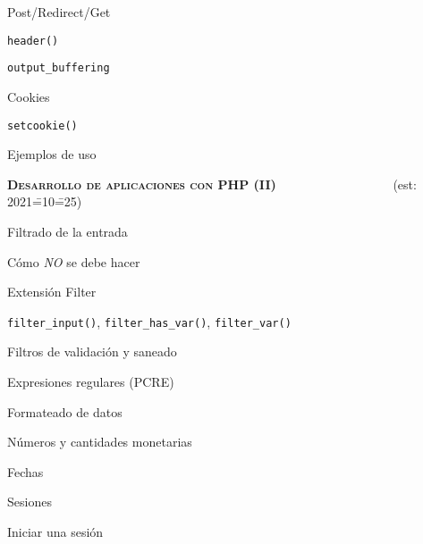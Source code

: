 \begin{longenum}
\begin{longenum}
\begin{longenum}
        \end{longenum}
        \item Post/Redirect/Get
        \item \texttt{header()}
        \begin{longenum}
            \item \texttt{output\_buffering}
        \end{longenum}
        \item Cookies
        \begin{longenum}
            \item \texttt{setcookie()}
            \item Ejemplos de uso
        \end{longenum}
    \end{longenum}
    \item \textbf{\textsc{Desarrollo de aplicaciones con PHP (II)}} \ \ \ \ \ \ \ \ \ \ \ \ \ \ \ \ \ \ (est: 2021\==10\==25)
    \begin{longenum}
        \item Filtrado de la entrada
        \begin{longenum}
            \item Cómo \textit{NO} se debe hacer
            \item Extensión Filter
            \begin{longenum}
                \item \texttt{filter\_input()}, \texttt{filter\_has\_var()}, \texttt{filter\_var()}
                \item Filtros de validación y saneado
            \end{longenum}
            \item Expresiones regulares (PCRE)
        \end{longenum}
        \item Formateado de datos
        \begin{longenum}
            \item Números y cantidades monetarias
            \item Fechas
        \end{longenum}
        \item Sesiones
        \begin{longenum}
            \item Iniciar una sesión
            \begin{longenum}

\end{longenum}
\end{longenum}
\end{longenum}
\end{longenum}
